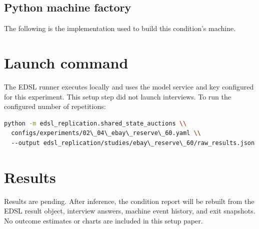 \documentclass[11pt]{article}
\begin{document}
\subsection{Python machine factory}
The following is the implementation used to build this condition's machine.


\section{Launch command}
The EDSL runner executes locally and uses the model service and key configured
for this experiment. This setup step did not launch interviews. To run the
configured number of repetitions:
\begin{lstlisting}[language=bash]
python -m edsl_replication.shared_state_auctions \\
  configs/experiments/02\_04\_ebay\_reserve\_60.yaml \\
  --output edsl_replication/studies/ebay\_reserve\_60/raw_results.json
\end{lstlisting}
\section{Results}
Results are pending. After inference, the condition report will be rebuilt from
the EDSL result object, interview answers, machine event history, and exit
snapshots. No outcome estimates or charts are included in this setup paper.
\end{document}
